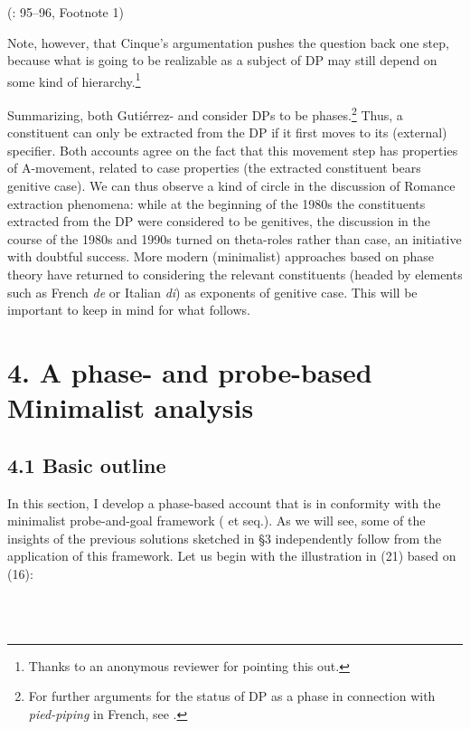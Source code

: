 \documentclass[output=paper]{langsci/langscibook}
\begin{document}
                (\citealt{Cinque2014}: 95–96, Footnote 1)

Note, however, that Cinque’s argumentation pushes the question back one step, because what is going to be realizable as a subject of DP may still depend on some kind of hierarchy.\footnote{Thanks to an anonymous reviewer for pointing this out.}

Summarizing, both Gutiérrez-\citet{Bravo2001} and \citet{Cinque2014} consider DPs to be phases.\footnote{For further arguments for the status of DP as a phase in connection with \textit{pied-piping} in French, see \citet{Heck2008}.} Thus, a constituent can only be extracted from the DP if it first moves to its (external) specifier. Both accounts agree on the fact that this movement step has properties of A-movement, related to case properties (the extracted constituent bears genitive case). We can thus observe a kind of circle in the discussion of Romance extraction phenomena: while at the beginning of the 1980s the constituents extracted from the DP were considered to be genitives, the discussion in the course of the 1980s and 1990s turned on theta-roles rather than case, an initiative with doubtful success. More modern (minimalist) approaches based on phase theory have returned to considering the relevant constituents (headed by elements such as French \textit{de} or Italian \textit{di}) as exponents of genitive case. This will be important to keep in mind for what follows.

\section{ 4. A phase- and probe-based Minimalist analysis} 

\subsection{ 4.1 Basic outline}

In this section, I develop a phase-based account that is in conformity with the minimalist probe-and-goal framework (\citealt{Chomsky2000} et seq.). As we will see, some of the insights of the previous solutions sketched in §3 independently follow from the application of this framework. Let us begin with the illustration in (21) based on (16):

  
 

\begin{styleFramecontents}
\ea%
    \label{ex:key:21}
    \gll\\
        \\
    \glt
    \z

        
\end{styleFramecontents}
\end{document}
